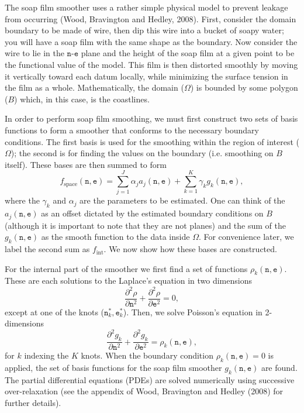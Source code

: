\documentclass[12pt]{article}
\newcommand{\beq}{\begin{equation}}
\newcommand{\eeq}{\end{equation}}
\theoremstyle{definition}
\theoremstyle{plain}
\begin{document}
The soap film smoother uses a rather simple physical model to prevent leakage from occurring (Wood, Bravington and Hedley, 2008). First, consider the domain boundary to be made of wire, then dip this wire into a bucket of soapy water; you will have a soap film with the same shape as the boundary. Now consider the wire to lie in the $\texttt{n}$-$\texttt{e}$ plane and the height of the soap film at a given point to be the functional value of the model. This film is then distorted smoothly by moving it vertically toward each datum locally, while minimizing the surface tension in the film as a whole. Mathematically, the domain ($\Omega$) is bounded by some polygon ($B$) which, in this case, is the coastlines.

In order to perform soap film smoothing, we must first construct two sets of basis functions to form a smoother that conforms to the necessary boundary conditions. The first basis is used for the smoothing within the region of interest ($\Omega$); the second is for finding the values on the boundary (i.e. smoothing on $B$ itself). These bases are then summed to form
$$
f_\text{space}(\texttt{n},\texttt{e})=\sum_{j=1}^J \alpha_j a_j(\texttt{n},\texttt{e}) + \sum_{k=1}^K \gamma_k g_k(\texttt{n},\texttt{e}),
$$
where the $\gamma_k$ and $\alpha_j$ are the parameters to be estimated. One can think of the $a_j(\texttt{n},\texttt{e})$ as an offset dictated by the estimated boundary conditions on $B$ (although it is important to note that they are not planes) and the sum of the $g_k(\texttt{n},\texttt{e})$ as the smooth function to the data inside $\Omega$. For convenience later, we label the second sum as $f_\text{int}$. We now show how these bases are constructed.

For the internal part of the smoother we first find a set of functions $\rho_k(\texttt{n},\texttt{e})$. These are each solutions to the Laplace's equation in two dimensions
$$
\frac{\partial^2\rho}{\partial \texttt{n}^2} + \frac{\partial^2\rho}{\partial \texttt{e}^2} = 0,
$$
except at one of the knots ($\texttt{n}^*_k,\texttt{e}^*_k$). Then, we solve Poisson's equation in 2-dimensions
\beq
\frac{\partial^2 g_k}{\partial \texttt{n}^2} + \frac{\partial^2 g_k}{\partial \texttt{e}^2} = \rho_k(\texttt{n},\texttt{e}),
\label{soap-poisson}
\eeq
for $k$ indexing the $K$ knots. When the boundary condition $\rho_k(\texttt{n},\texttt{e})=0$ is applied, the set of basis functions for the soap film smoother $g_k(\texttt{n},\texttt{e})$ are found.  The partial differential equations (PDEs) are solved numerically using successive over-relaxation (see the appendix of Wood, Bravington and Hedley (2008) for further details).
\end{document}
